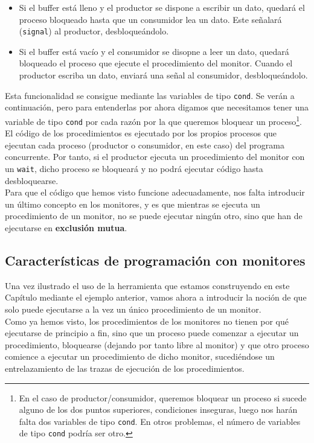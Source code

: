 \begin{ejemplo}
    \begin{itemize}
        \item Si el buffer está lleno y el productor se dispone a escribir un dato, quedará el proceso bloqueado hasta que un consumidor lea un dato. Este señalará (\verb|signal|) al productor, desbloqueándolo.
        \item Si el buffer está vacío y el consumidor se disopne a leer un dato, quedará bloqueado el proceso que ejecute el procedimiento del monitor. Cuando el productor escriba un dato, enviará una señal al consumidor, desbloqueándolo.
    \end{itemize}
    Esta funcionalidad se consigue mediante las variables de tipo \verb|cond|. Se verán a continuación, pero para entenderlas por ahora digamos que necesitamos tener una variable de tipo \verb|cond| por cada razón por la que queremos bloquear un proceso\footnote{En el caso de productor/consumidor, queremos bloquear un proceso si sucede alguno de los dos puntos superiores, condiciones inseguras, luego nos harán falta dos variables de tipo \texttt{cond}. En otros problemas, el número de variables de tipo \texttt{cond} podría ser otro.}.\\

    El código de los procedimientos es ejecutado por los propios procesos que ejecutan cada proceso (productor o consumidor, en este caso) del programa concurrente. Por tanto, si el productor ejecuta un procedimiento del monitor con un \verb|wait|, dicho proceso se bloqueará y no podrá ejecutar código hasta desbloquearse.\\

    Para que el código que hemos visto funcione adecuadamente, nos falta introducir un último concepto en los monitores, y es que mientras se ejecuta un procedimiento de un monitor, no se puede ejecutar ningún otro, sino que han de ejecutarse en \textbf{exclusión mutua}.
\end{ejemplo}

\subsection{Características de programación con monitores}
Una vez ilustrado el uso de la herramienta que estamos construyendo en este Capítulo mediante el ejemplo anterior, vamos ahora a introducir la noción de que solo puede ejecutarse a la vez un único procedimiento de un monitor.\\

Como ya hemos visto, los procedimientos de los monitores no tienen por qué ejecutarse de principio a fin, sino que un proceso puede comenzar a ejecutar un procedimiento, bloquearse (dejando por tanto libre al monitor) y que otro proceso comience a ejecutar un procedimiento de dicho monitor, sucediéndose un entrelazamiento de las trazas de ejecución de los procedimientos.\\

